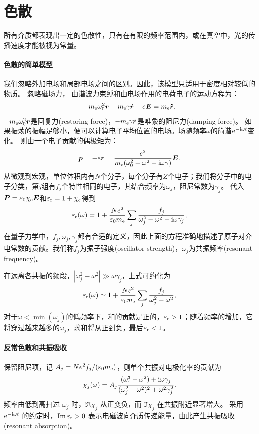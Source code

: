 \section{色散}

所有介质都表现出一定的色散性，只有在有限的频率范围内，或在真空中，光的传播速度才能被视为常量。

\paragraph{色散的简单模型}
我们忽略外加电场和局部电场之间的区别。因此，该模型只适用于密度相对较低的物质。
忽略磁场力，
由谐波力束缚和由电场作用的电荷电子的运动方程为：
\[
    -m_{\mathrm{e}}\omega_0^2\bm r - m_{\mathrm{e}}\gamma\dot{\bm{r}} - e\bm E = m_{\mathrm{e}}\ddot{\bm r}.
\]
$-m_{\mathrm{e}}\omega_0^2\bm r$是回复力(restoring force)，$-m_{\mathrm{e}}\gamma\dot{\bm{r}}$是唯象的阻尼力(damping force)。
如果振荡的振幅足够小，便可以计算电子平均位置的电场。场随频率$\omega$的简谐$\mathop{}\!\mathrm{e}^{-\mathrm{i}\omega t}$变化。
则由一个电子贡献的偶极矩为：
\[
    \bm p = -e\bm r = \frac{e^2}{m_{\mathrm{e}}(\omega_0^2 - \omega^2 - \mathrm{i}\omega\gamma)}\bm E.
\]
从微观到宏观，单位体积内有$N$个分子，每个分子有$Z$个电子；我们将分子中的电子分类，第$j$组有$f_j$个特性相同的电子，其结合频率为$\omega_j$，阻尼常数为$\gamma_j$。
代入$\bm P = \varepsilon_0\chi_\mathrm e\bm E$和$\varepsilon_\mathrm r = 1 + \chi_\mathrm e$得到
\begin{equation}
    \varepsilon_\mathrm r(\omega) = 1 + \frac{Ne^2}{\varepsilon_0m_{\mathrm{e}}}\sum_j\frac{f_j}{\omega_j^2 - \omega^2 - \mathrm{i}\omega\gamma_j},
\end{equation}
在量子力学中，$f_j,\omega_j,\gamma_j$都有合适的定义，因此上面的方程准确地描述了原子对介电常数的贡献。我们称$f_j$为振子强度(oscillator strength)，$\omega_j$为共振频率(resonant frequency)。

在远离各共振的频段，$|\omega_j^2 - \omega^2| \gg \omega\gamma_j$，上式可约化为
\[
    \varepsilon_\mathrm r(\omega) \simeq 1 + \frac{Ne^2}{\varepsilon_0m_{\mathrm{e}}}\sum_j\frac{f_j}{\omega_j^2 - \omega^2},
\]
对于$\omega < \min(\omega_j)$的低频率下，和的贡献是正的，$\varepsilon_\mathrm r > 1$；随着频率的增加，它将穿过越来越多的$\omega_j$，求和将从正到负，最后$\varepsilon_\mathrm r < 1$。

\paragraph{反常色散和共振吸收}

保留阻尼项，记 $A_j = Ne^2f_j/(\varepsilon_0m_{\mathrm{e}})$，则单个共振对电极化率的贡献为
\begin{equation}
    \label{eq:ed-lorentz-oscillator-susceptibility}
    \chi_j(\omega) = A_j\frac{(\omega_j^2 - \omega^2) + \mathrm{i}\omega\gamma_j}
    {(\omega_j^2 - \omega^2)^2 + \omega^2\gamma_j^2}.
\end{equation}
频率由低到高扫过 $\omega_j$ 时，$\Re\chi_j$ 从正变负，而 $\Im\chi_j$ 在共振附近显著增大。
采用 $\mathop{}\!\mathrm{e}^{-\mathrm{i}\omega t}$ 的约定时，$\operatorname{Im}\varepsilon_\mathrm r > 0$ 表示电磁波向介质传递能量，由此产生共振吸收(resonant absorption)。

